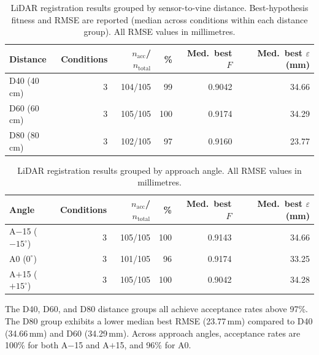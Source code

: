 \begin{table}[htbp]
  \centering
  \caption{LiDAR registration results grouped by sensor-to-vine distance. Best-hypothesis fitness and RMSE are reported (median across conditions within each distance group). All RMSE values in millimetres.}
  \label{tab:pa-results-lidar-by-distance}
  \begin{tabular}{@{} l r r r r r @{}}
    \toprule
    \textbf{Distance} &
    \textbf{Conditions} &
    \boldmath$n_\text{acc}$\textbf{/}\boldmath$n_\text{total}$ &
    \textbf{\%} &
    \textbf{Med.\ best} \boldmath$F$ &
    \textbf{Med.\ best} \boldmath$\varepsilon$ \textbf{(mm)} \\
    \midrule
    D40 (40\,cm)  & 3 & 104/105 &  99 & 0.9042 & 34.66 \\
    D60 (60\,cm)  & 3 & 105/105 & 100 & 0.9174 & 34.29 \\
    D80 (80\,cm)  & 3 & 102/105 &  97 & 0.9160 & 23.77 \\
    \bottomrule
  \end{tabular}
\end{table}

\begin{table}[htbp]
  \centering
  \caption{LiDAR registration results grouped by approach angle. All RMSE values in millimetres.}
  \label{tab:pa-results-lidar-by-angle}
  \begin{tabular}{@{} l r r r r r @{}}
    \toprule
    \textbf{Angle} &
    \textbf{Conditions} &
    \boldmath$n_\text{acc}$\textbf{/}\boldmath$n_\text{total}$ &
    \textbf{\%} &
    \textbf{Med.\ best} \boldmath$F$ &
    \textbf{Med.\ best} \boldmath$\varepsilon$ \textbf{(mm)} \\
    \midrule
    A$-$15 ($-15^{\circ}$) & 3 & 105/105 & 100 & 0.9143 & 34.66 \\
    A0 ($0^{\circ}$)       & 3 & 101/105 &  96 & 0.9174 & 33.25 \\
    A$+$15 ($+15^{\circ}$) & 3 & 105/105 & 100 & 0.9042 & 34.28 \\
    \bottomrule
  \end{tabular}
\end{table}

The D40, D60, and D80 distance groups all achieve acceptance rates above 97\%. The D80 group exhibits a lower median best RMSE (23.77\,mm) compared to D40 (34.66\,mm) and D60 (34.29\,mm). Across approach angles, acceptance rates are 100\% for both A$-$15 and A$+$15, and 96\% for A0.

